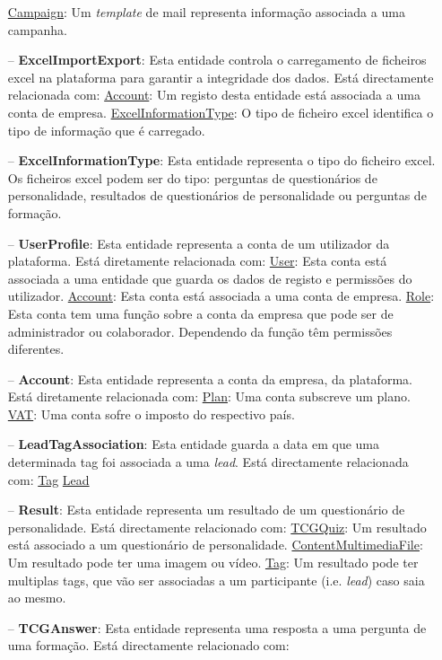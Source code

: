 \begin{itemize}
		\subitem \underline{Campaign}: Um \textit{template} de mail representa informação associada a uma campanha.
	\item[--] \textbf{ExcelImportExport}: Esta entidade controla o carregamento de ficheiros excel na plataforma para garantir a integridade dos dados. Está directamente relacionada com:
		\subitem \underline{Account}: Um registo desta entidade está associada a uma conta de empresa.
		\subitem \underline{ExcelInformationType}: O tipo de ficheiro excel identifica o tipo de informação que é carregado.
	\item[--] \textbf{ExcelInformationType}: Esta entidade representa o tipo do ficheiro excel. Os ficheiros excel podem ser do tipo: perguntas de questionários de personalidade, resultados de questionários de personalidade ou perguntas de formação.
	\item[--] \textbf{UserProfile}: Esta entidade representa a conta de um utilizador da plataforma. Está diretamente relacionada com:
		\subitem \underline{User}: Esta conta está associada a uma entidade que guarda os dados de registo e permissões do utilizador.
		\subitem \underline{Account}: Esta conta está associada a uma conta de empresa.
		\subitem \underline{Role}: Esta conta tem uma função sobre a conta da empresa que pode ser de administrador ou colaborador. Dependendo da função têm permissões diferentes.
	\item[--] \textbf{Account}: Esta entidade representa a conta da empresa, da plataforma. Está diretamente relacionada com:
		\subitem \underline{Plan}: Uma conta subscreve um plano.
		\subitem \underline{VAT}: Uma conta sofre o imposto do respectivo país.
	\item[--] \textbf{LeadTagAssociation}: Esta entidade guarda a data em que uma determinada tag foi associada a uma \textit{lead}. Está directamente relacionada com:
		\subitem \underline{Tag}
		\subitem \underline{Lead}
	\item[--] \textbf{Result}: Esta entidade representa um resultado de um questionário de personalidade. Está directamente relacionado com:
		\subitem \underline{TCGQuiz}: Um resultado está associado a um questionário de personalidade.
		\subitem \underline{ContentMultimediaFile}: Um resultado pode ter uma imagem ou vídeo.
		\subitem \underline{Tag}: Um resultado pode ter multiplas tags, que vão ser associadas a um participante (i.e. \textit{lead}) caso saia ao mesmo.
	\item[--] \textbf{TCGAnswer}: Esta entidade representa uma resposta a uma pergunta de uma formação. Está directamente relacionado com:

\end{itemize}
